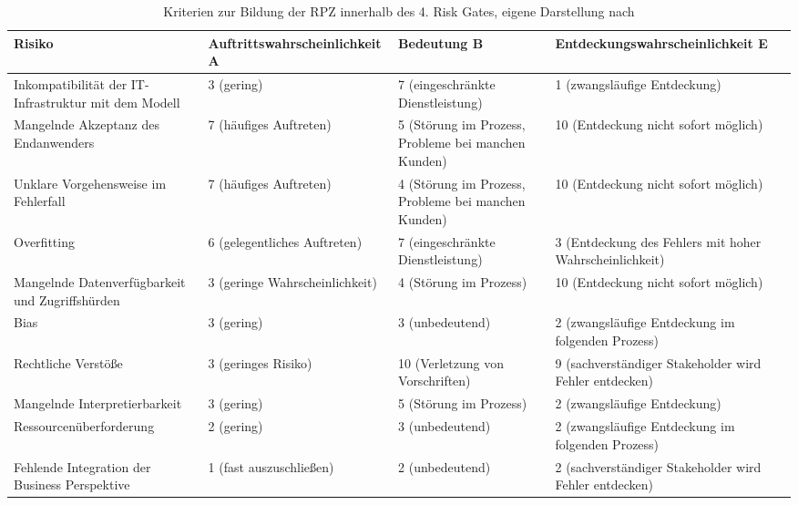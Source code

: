 \begin{table}[H]
\centering
\renewcommand{\arraystretch}{1.3}
\begin{tabular}{|p{3cm}|p{4.9cm}|p{3cm}|p{4.9cm}|}
\hline
\textbf{Risiko} & \textbf{Auftritts\-wahrscheinlichkeit A} & \textbf{Bedeutung B} & \textbf{Entdeckungs\-wahrscheinlichkeit E} \\
\hline

Inkompatibilität der IT-Infrastruktur mit dem Modell
& 3 (gering)
& 7 (eingeschränkte Dienstleistung)
& 1 (zwangsläufige Entdeckung) \\
\hline

Mangelnde Akzeptanz des Endanwenders
& 7 (häufiges Auftreten)
& 5 (Störung im Prozess, Probleme bei manchen Kunden)
& 10 (Entdeckung nicht sofort möglich) \\
\hline

Unklare Vorgehensweise im Fehlerfall
& 7 (häufiges Auftreten)
& 4 (Störung im Prozess, Probleme bei manchen Kunden)
& 10 (Entdeckung nicht sofort möglich) \\
\hline

Overfitting 
& 6 (gelegentliches Auftreten)
& 7 (eingeschränkte Dienstleistung)
& 3 (Entdeckung des Fehlers mit hoher Wahrscheinlichkeit) \\
\hline

Mangelnde Datenverfügbarkeit und Zugriffshürden
& 3 (geringe Wahrscheinlichkeit)
& 4 (Störung im Prozess)
& 10 (Entdeckung nicht sofort möglich) \\
\hline

Bias 
& 3 (gering)
& 3 (unbedeutend)
& 2 (zwangsläufige Entdeckung im folgenden Prozess) \\
\hline

Rechtliche Verstöße
& 3 (geringes Risiko)
& 10 (Verletzung von Vorschriften)
& 9 (sachverständiger Stakeholder wird Fehler entdecken) \\
\hline

Mangelnde Interpretierbarkeit
& 3 (gering)
& 5 (Störung im Prozess)
& 2 (zwangsläufige Entdeckung) \\
\hline

Res\-sour\-cen\-über\-for\-de\-rung
& 2 (gering)
& 3 (unbedeutend)
& 2 (zwangsläufige Entdeckung im folgenden Prozess) \\
\hline

Fehlende Integration der Business Perspektive
& 1 (fast auszuschließen)
& 2 (unbedeutend)
& 2 (sachverständiger Stakeholder wird Fehler entdecken) \\
\hline

\end{tabular}
\caption{Kriterien zur Bildung der RPZ innerhalb des 4. Risk Gates, eigene Darstellung nach \cite{Bundesministerium_2018}}
\label{tab:cs2_app_rg4_kriterien_rpz}
\end{table}

